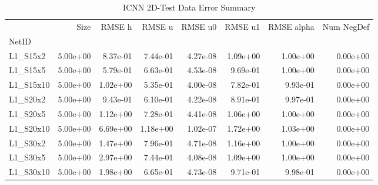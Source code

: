 \documentclass{article}
\theoremstyle{remark}
\numberwithin{equation}{subsection}
\begin{document}
\begin{table}[H]
\begin{tabular}{lrrrrrrr}
	\toprule
	{} &     Size &   RMSE h &   RMSE u &  RMSE u0 &  RMSE u1 &  RMSE alpha &  Num NegDef \\
	NetID     &          &          &          &          &          &             &             \\
	\midrule
	L1\_S15x2  & 5.00e+00 & 8.37e-01 & 7.44e-01 & 4.27e-08 & 1.09e+00 &    1.00e+00 &    0.00e+00 \\
	L1\_S15x5  & 5.00e+00 & 5.79e-01 & 6.63e-01 & 4.53e-08 & 9.69e-01 &    1.00e+00 &    0.00e+00 \\
	L1\_S15x10 & 5.00e+00 & 1.02e+00 & 5.35e-01 & 4.00e-08 & 7.82e-01 &    9.93e-01 &    0.00e+00 \\
	L1\_S20x2  & 5.00e+00 & 9.43e-01 & 6.10e-01 & 4.22e-08 & 8.91e-01 &    9.97e-01 &    0.00e+00 \\
	L1\_S20x5  & 5.00e+00 & 1.12e+00 & 7.28e-01 & 4.41e-08 & 1.06e+00 &    1.00e+00 &    0.00e+00 \\
	L1\_S20x10 & 5.00e+00 & 6.69e+00 & 1.18e+00 & 1.02e-07 & 1.72e+00 &    1.03e+00 &    0.00e+00 \\
	L1\_S30x2  & 5.00e+00 & 1.47e+00 & 7.96e-01 & 4.71e-08 & 1.16e+00 &    1.00e+00 &    0.00e+00 \\
	L1\_S30x5  & 5.00e+00 & 2.97e+00 & 7.44e-01 & 4.08e-08 & 1.09e+00 &    1.00e+00 &    0.00e+00 \\
	L1\_S30x10 & 5.00e+00 & 1.98e+00 & 6.65e-01 & 4.73e-08 & 9.71e-01 &    9.98e-01 &    0.00e+00 \\
	\bottomrule
\end{tabular}
\caption{ICNN 2D-Test Data Error Summary}
\end{table}
\end{document}
